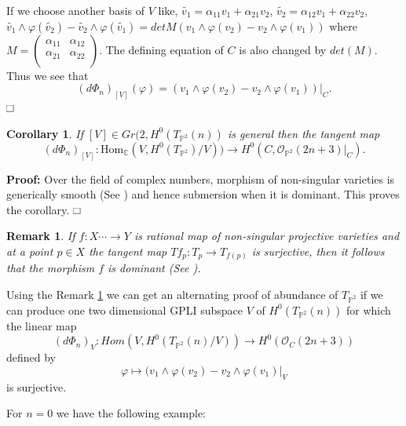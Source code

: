 \documentclass[11pt]{amsart}
\newtheorem{corol}[subsection]{Corollary}
\newtheorem{rem}[subsection]{Remark}
\theoremstyle{definition}
\renewcommand\square{\frame{\phantom{{\large x}}}}
\begin{document}
  If we choose another basis of $V$ like,
  $\tilde{v_{1}}=\alpha_{11}v_{1}+\alpha_{21}v_{2}$, 
  $\tilde{v_{2}}=\alpha_{12}v_{1}+\alpha_{22}v_{2}$, 
  $ \tilde{v_{1}}\wedge \varphi(\tilde{v_{2}})-\tilde{v_{2}}\wedge \varphi(\tilde{v_{1}})= detM(v_{1}\wedge \varphi(v_{2})-v_{2}\wedge \varphi(v_{1}))$ where 
  $M=\left ( \begin{array}{cc}\alpha_{11}&\alpha_{12}\\ \alpha_{21}&\alpha_{22}\\ \end{array}\right).$ The defining equation of $C$ is also changed by $det(M).$
  Thus we see that 
 $$(d\Phi_n)_{[V]}(\varphi)= (v_1 \wedge \varphi(v_2) - v_2 \wedge \varphi(v_1))|_C.$$  $\hfill{\square}$
 \begin{corol}\label{cor2}
  If $[V] \in Gr(2, H^0(T_{\mathbb{P}^2}(n))$ is general then the tangent map 
 $$(d\Phi_n)_{[V]} :\text{Hom}_{\mathbb{C}}(V , H^0(T_{\mathbb{P}^2})/V)) \to H^0(C, \mathcal{O}_{\mathbb{P}^2}(2n+3)|_C).$$  
 \end{corol}
{\bf Proof:} Over the field of complex numbers, morphism of non-singular varieties is generically smooth (See {\cite[Chapter III, Corollary 10.7]{Ha}}) and hence  submersion when it is dominant. This proves the corollary. $\hfill{\square}$

\begin{rem}\label{rem1}
 If $f : X \cdots\to Y $ is rational map of non-singular projective varieties and at a point $p \in X$
  the tangent map $Tf_p : T_p \to T_{f(p)}$ is surjective, then it follows
  that the morphism $f$ is dominant (See {\cite[Chapter III, \S 10]{Ha}}).
\end{rem}
Using the Remark \ref{rem1} we can get an alternating  proof of abundance of $T_{\mathbb{P}^2}$ if we can produce one two dimensional GPLI subspace $V$ of
$H^0(T_{{\mathbb{P}}^2}(n))$   for which the linear map 
$$ 
(d\Phi_n)_V: Hom(V,H^0(T_{\mathbb{P}^2}(n)/V)) \to H^0(\mathcal O_{C}(2n+3)) $$ 
defined by 
$$ \varphi \mapsto (v_{1}\wedge \varphi(v_{2})-v_{2}\wedge \varphi(v_{1})|_V$$ is surjective.

For $n=0$ we have the following example:
\end{document}
